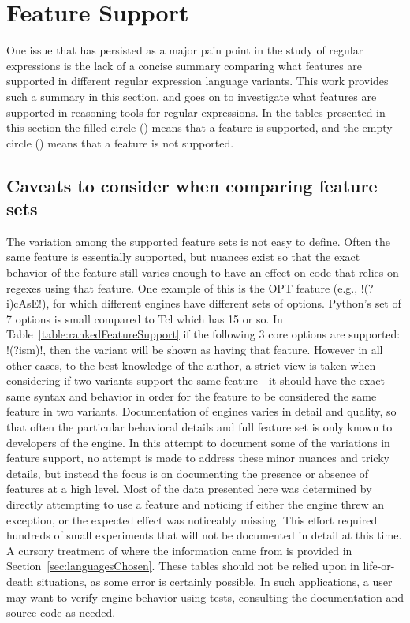 \section{Feature Support}

One issue that has persisted as a major pain point in the study of regular expressions is the lack of a concise summary comparing what features are supported in different regular expression language variants.  This work provides such a summary in this section, and goes on to investigate what features are supported in reasoning tools for regular expressions.  In the tables presented in this section the filled circle (\yes) means that a feature is supported, and the empty circle (\no) means that a feature is not supported.

\subsection{Caveats to consider when comparing feature sets}
The variation among the supported feature sets is not easy to define.  Often the same feature is essentially supported, but nuances exist so that the exact behavior of the feature still varies enough to have an effect on code that relies on regexes using that feature.  One example of this is the OPT feature (e.g., \cverb!(?i)cAsE!), for which different engines have different sets of options.  Python's set of 7 options is small compared to Tcl which has 15 or so.  In Table~\ref{table:rankedFeatureSupport} if the following 3 core options are supported: \cverb!(?ism)!, then the variant will be shown as having that feature.  However in all other cases, to the best knowledge of the author, a strict view is taken when considering if two variants support the same feature - it should have the exact same syntax and behavior in order for the feature to be considered the same feature in two variants.  Documentation of engines varies in detail and quality, so that often the particular behavioral details and full feature set is only known to developers of the engine.  In this attempt to document some of the variations in feature support, no attempt is made to address these minor nuances and tricky details, but instead the focus is on documenting the presence or absence of features at a high level.  Most of the data presented here was determined by directly attempting to use a feature and noticing if either the engine threw an exception, or the expected effect was noticeably missing.  This effort required hundreds of small experiments that will not be documented in detail at this time.  A cursory treatment of where the information came from is provided in Section~\ref{sec:languagesChosen}.  These tables should not be relied upon in life-or-death situations, as some error is certainly possible.  In such applications, a user may want to verify engine behavior using tests, consulting the documentation and source code as needed.

